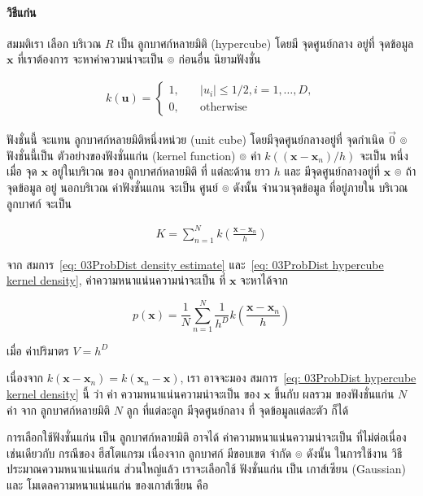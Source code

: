 \paragraph{วิธีแก่น} สมมติเรา เลือก บริเวณ $R$ เป็น ลูกบาศก์หลายมิติ (hypercube) โดยมี จุดศูนย์กลาง อยู่ที่ จุดข้อมูล $\mathbf{x}$ ที่เราต้องการ จะหาค่าความน่าจะเป็น
๏ ก่อนอื่น นิยามฟังชั่น

\begin{eqnarray}
 k(\mathbf{u}) = 
 \left\{ 
  \begin{array}{ll}
    1, & \quad |u_i| \le 1/2, i = 1,\ldots, D, \\
    0, & \quad \mbox{otherwise}
  \end{array} 
  \right.
\end{eqnarray}

ฟังชั่นนี้ จะแทน ลูกบาศก์หลายมิติหนึ่งหน่วย (unit cube) โดยมีจุดศูนย์กลางอยู่ที่ จุดกำเนิด $\vec{0}$
๏ ฟังชั่นนี้เป็น ตัวอย่างของฟังชั่นแก่น (kernel function)
๏ ค่า $k((\mathbf{x} - \mathbf{x}_n)/h)$ จะเป็น หนึ่ง เมื่อ จุด $\mathbf{x}$ อยู่ในบริเวณ ของ ลูกบาศก์หลายมิติ ที่ แต่ละด้าน ยาว $h$ และ มีจุดศูนย์กลางอยู่ที่ $\mathbf{x}$
๏ ถ้า จุดข้อมูล อยู่ นอกบริเวณ ค่าฟังชั่นแกน จะเป็น ศูนย์
๏ ดังนั้น จำนวนจุดข้อมูล ที่อยู่ภายใน บริเวณลูกบาศก์ จะเป็น

\begin{eqnarray}
K = \sum_{n=1}^N k \left( \frac{\mathbf{x} - \mathbf{x}_n}{h} \right)
\label{eq: 03ProbDist hypercube kernel density}
\end{eqnarray}

จาก สมการ~\ref{eq: 03ProbDist density estimate} และ~\ref{eq: 03ProbDist hypercube kernel density}, ค่าความหนาแน่นความน่าจะเป็น ที่ $\mathbf{x}$ จะหาได้จาก

\begin{equation}
p(\textbf{x}) = \frac{1}{N} \sum_{n=1}^N \frac{1}{h^D} k \left( \frac{\mathbf{x} - \mathbf{x}_n}{h} \right)
\end{equation}

เมื่อ ค่าปริมาตร $V = h^D$

เนื่องจาก $k(\mathbf{x}-\mathbf{x}_n) = k(\mathbf{x}_n - \mathbf{x})$,
เรา อาจจะมอง 
สมการ~\ref{eq: 03ProbDist hypercube kernel density} นี้ ว่า ค่า ความหนาแน่นความน่าจะเป็น ของ $\mathbf{x}$ ขึ้นกับ ผลรวม ของฟังชั่นแก่น $N$ ค่า จาก ลูกบาศก์หลายมิติ $N$ ลูก ที่แต่ละลูก มีจุดศูนย์กลาง ที่ จุดข้อมูลแต่ละตัว ก็ได้

การเลือกใช้ฟังชั่นแก่น เป็น ลูกบาศก์หลายมิติ อาจได้ ค่าความหนาแน่นความน่าจะเป็น ที่ไม่ต่อเนื่อง เช่นเดียวกับ กรณีของ ฮีสโตแกรม เนื่องจาก ลูกบาศก์ มีขอบเขต จำกัด
๏ ดังนั้น ในการใช้งาน วิธีประมาณความหนาแน่นแก่น ส่วนใหญ่แล้ว เราจะเลือกใช้ ฟังชั่นแก่น เป็น เกาส์เซียน (Gaussian) 
และ โมเดลความหนาแน่นแก่น ของเกาส์เซียน คือ

